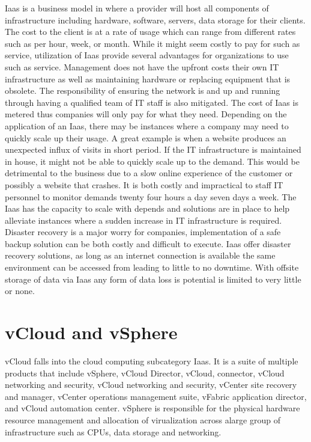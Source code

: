 \documentclass[9pt,twocolumn,twoside]{../../styles/osajnl}
\begin{document}
Iaas is a business model in where a provider will host all components
of infrastructure including hardware, software, servers, data storage
for their clients.  The cost to the client is at a rate of usage which can
range from different rates such as per hour, week, or month.  While it
might seem costly to pay for such as service, utilization of Iaas
provide several advantages for organizations to use such as service.
Management does not have the upfront costs their own IT infrastructure
as well as maintaining hardware or replacing equipment that is
obsolete.  The responsibility of ensuring the network is and up and
running through having a qualified team of IT staff is also mitigated.
The cost of Iaas is metered thus companies will only pay for what they
need\cite{www-statetech}. Depending on the application of an Iaas, there
may be instances where a company may need to quickly scale up their
usage.  A great example is when a website produces an unexpected
influx of visits in short period.  If the IT infrastructure is
maintained in house, it might not be able to quickly scale up to the
demand.  This would be detrimental to the business due to a slow
online experience of the customer or possibly a website that
crashes\cite{www-linkedin}. It is both costly and impractical to
staff IT personnel to monitor demands twenty four hours a day seven
days a week.  The Iaas has the capacity to scale with depends and
solutions are in place to help alleviate instances where a sudden
increase in IT infrastructure is required.  Disaster recovery is a
major worry for companies, implementation of a safe backup solution
can be both costly and difficult to execute.  Iaas offer disaster
recovery solutions, as long as an internet connection is available the
same environment can be accessed from leading to little to no
downtime.  With offsite storage of data via Iaas any form of data loss
is potential is limited to very little or none\cite{www-statetech}.

\section{vCloud and vSphere}

vCloud falls into the cloud computing subcategory Iaas.  It is a suite
of multiple products that include vSphere, vCloud Director, vCloud,
connector, vCloud networking and security, vCloud networking and
security, vCenter site recovery and manager, vCenter operations
management suite, vFabric application director, and vCloud automation
center.  vSphere is responsible for the physical hardware resource
management and allocation of virualization across alarge group of
infrastructure such as CPUs, data storage and networking.
\end{document}
